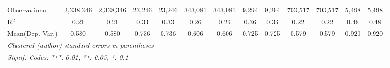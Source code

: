 \begin{tabular}{lcccccccccccc}
   Observations                             & 2,338,346     & 2,338,346      & 23,246        & 23,246         & 343,081       & 343,081         & 9,294        & 9,294       & 703,517       & 703,517        & 5,498         & 5,498\\  
   R$^2$                                    & 0.21          & 0.21           & 0.33          & 0.33           & 0.26          & 0.26            & 0.36         & 0.36        & 0.22          & 0.22           & 0.48          & 0.48\\  
Mean(Dep. Var.) & 0.580 & 0.580 & 0.736 & 0.736 & 0.606 & 0.606 & 0.725 & 0.725 & 0.579 & 0.579 & 0.920 & 0.920 \\
   \midrule \midrule
   \multicolumn{13}{l}{\emph{Clustered (author) standard-errors in parentheses}}\\
   \multicolumn{13}{l}{\emph{Signif. Codes: ***: 0.01, **: 0.05, *: 0.1}}\\
\end{tabular}
\par\endgroup

